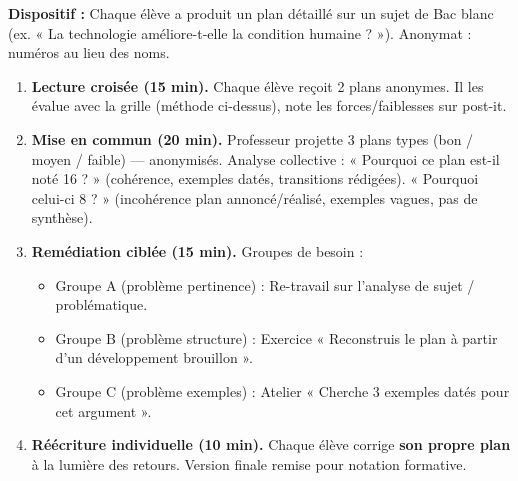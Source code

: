 \documentclass[11pt]{article}
\begin{document}
\begin{experience}
\textbf{Dispositif :} Chaque élève a produit un plan détaillé sur un sujet de Bac blanc (ex. « La technologie améliore-t-elle la condition humaine ? »). Anonymat : numéros au lieu des noms.
\begin{enumerate}
\item \textbf{Lecture croisée (15 min).} Chaque élève reçoit 2 plans anonymes. Il les évalue avec la grille (méthode ci-dessus), note les forces/faiblesses sur post-it.
\item \textbf{Mise en commun (20 min).} Professeur projette 3 plans types (bon / moyen / faible) — anonymisés. Analyse collective : « Pourquoi ce plan est-il noté 16 ? » (cohérence, exemples datés, transitions rédigées). « Pourquoi celui-ci 8 ? » (incohérence plan annoncé/réalisé, exemples vagues, pas de synthèse).
\item \textbf{Remédiation ciblée (15 min).} Groupes de besoin :
\begin{itemize}
\item Groupe A (problème pertinence) : Re-travail sur l'analyse de sujet / problématique.
\item Groupe B (problème structure) : Exercice « Reconstruis le plan à partir d'un développement brouillon ».
\item Groupe C (problème exemples) : Atelier « Cherche 3 exemples datés pour cet argument ».
\end{itemize}
\item \textbf{Réécriture individuelle (10 min).} Chaque élève corrige \textbf{son propre plan} à la lumière des retours. Version finale remise pour notation formative.
\end{enumerate}
\end{experience}
\end{document}
